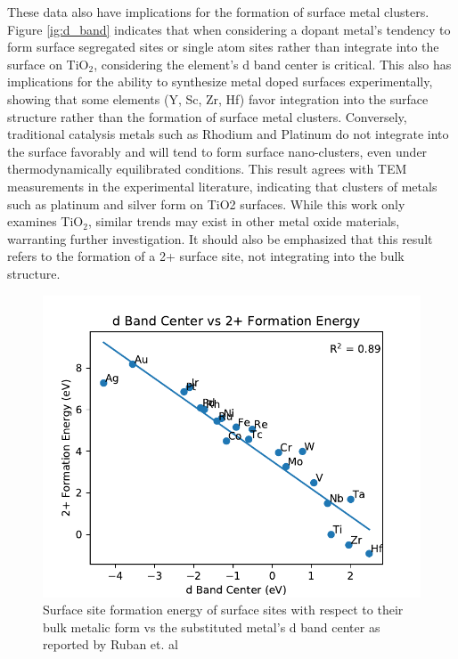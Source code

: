 \documentclass[catalysts,article,submit,moreauthors,pdftex,10pt,a4paper]{mdpi}
\theoremstyle{mdpi}
\newcounter{ex}
\newcounter{re}
\theoremstyle{mdpidefinition}
\begin{document}
These data also have implications for the formation of surface metal clusters. Figure \ref{ig:d_band} indicates that when considering a dopant metal's tendency to form surface segregated sites or single atom sites rather than integrate into the surface on TiO$_2$, considering the element's d band center is critical. This also has implications for the ability to synthesize metal doped surfaces experimentally, showing that some elements (Y, Sc, Zr, Hf) favor integration into the surface structure rather than the formation of surface metal clusters. Conversely, traditional catalysis metals such as Rhodium and Platinum do not integrate into the surface favorably and will tend to form surface nano-clusters, even under thermodynamically equilibrated conditions. This result agrees with TEM measurements in the experimental literature, indicating that clusters of metals such as platinum and silver form on TiO2 surfaces.\cite{Iliev_2006}  While this work only examines TiO$_2$, similar trends may exist in other metal oxide materials, warranting further investigation. It should also be emphasized that this result refers to the formation of a 2+ surface site, not integrating into the bulk structure.

\begin{figure}
    \centering
    \includegraphics[width=0.8\linewidth]{Images/d_band_vs_formation.pdf}
    \caption{Surface site formation energy of surface sites with respect to their bulk metalic form vs the substituted metal's d band center as reported by Ruban et. al \cite{Ruban_1997}}
    \label{fig:d_band}
\end{figure}
\end{document}
